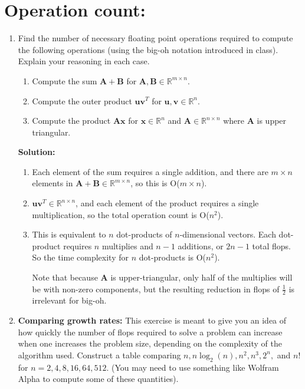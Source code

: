 \documentclass[]{article}
\newcommand{\half}{\frac{1}{2}}			%
\newcommand{\R}{\mathbb{R}}				%
\newcommand{\x}{\bm{x}}					%
\newcommand{\A}{\bm{A}}					%
\newcommand{\solution}{\vskip 0.5cm \textbf{\large Solution:} \\}
\begin{document}
    \section*{Operation count:}
    \begin{enumerate}[resume]
	\item Find the number of necessary floating point operations required to compute the following operations (using the big-oh notation introduced in class). Explain your reasoning in each case.
	  \begin{enumerate}
	  \item Compute the sum $\A+\bm{B}$ for $\A,\bm{B}\in\R^{m\times n}$.
	  \item Compute the outer product $\bm{uv}^T$ for $\bm{u},\bm{v}\in\R^n$.
	  \item Compute the product $\A\x$ for $\x\in\R^n$ and $\A\in\R^{n\times n}$ where $\A$ is upper triangular.
	  \end{enumerate}

	  \solution
	  \begin{enumerate}
	  \item
        Each element of the sum requires a single addition, and there
        are $m \times n$ elements in $\A + \bm{B} \in \R^{m \times n}$, so
        this is O($m \times n$).

      \item $\bm{uv}^T \in \R^{n \times n}$, and each element of the
        product requires a single multiplication, so the total
        operation count is O($n^2$).

      \item This is equivalent to $n$ dot-products of $n$-dimensional
        vectors. Each dot-product requires $n$ multiplies and $n-1$
        additions, or $2n - 1$ total flops. So the time complexity for
        $n$ dot-products is O($n^2$).

        Note that because $\A$ is upper-triangular, only half of the
        multiplies will be with non-zero components, but the resulting
        reduction in flops of $\half$ is irrelevant for big-oh.
	  \end{enumerate}


	\item \textbf{Comparing growth rates:} This exercise is meant to
      give you an idea of how quickly the number of flops required to
      solve a problem can increase when one increases the problem
      size, depending on the complexity of the algorithm
      used. Construct a table comparing $n,n\log_2(n),n^2,n^3,2^n,$
      and $n!$ for $n=2,4,8,16,64,512$. (You may need to use something
      like Wolfram Alpha to compute some of these quantities).


\end{enumerate}
\end{document}
